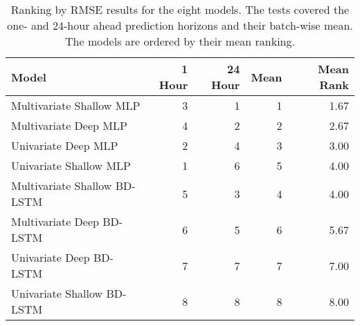 \begin{table}[H]
\centering
\begin{tabular}{lrrr|r}
\toprule
Model & 1 Hour & 24 Hour & Mean & Mean Rank \\
\midrule
Multivariate Shallow MLP & 3 & 1 & 1 & 1.67 \\
Multivariate Deep MLP & 4 & 2 & 2 & 2.67 \\
Univariate Deep MLP & 2 & 4 & 3 & 3.00 \\
Univariate Shallow MLP & 1 & 6 & 5 & 4.00 \\
Multivariate Shallow BD-LSTM & 5 & 3 & 4 & 4.00 \\
Multivariate Deep BD-LSTM & 6 & 5 & 6 & 5.67 \\
Univariate Deep BD-LSTM & 7 & 7 & 7 & 7.00 \\
Univariate Shallow BD-LSTM & 8 & 8 & 8 & 8.00 \\
\bottomrule
\end{tabular}
\caption{Ranking by RMSE results for the eight models. The tests covered the one- and 24-hour ahead prediction horizons and their batch-wise mean. The models are ordered by their mean ranking.}
\label{rmse-ranks}
\end{table}
